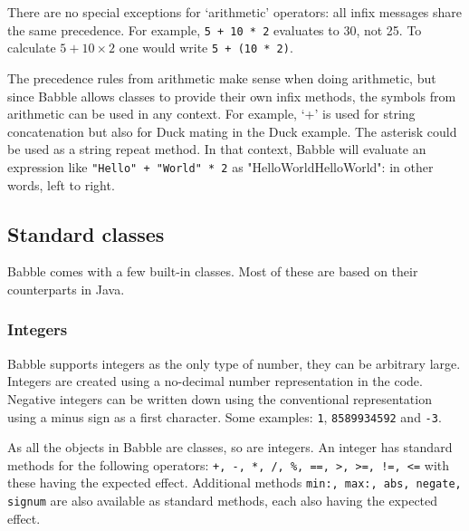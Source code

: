 \documentclass[a4paper]{article}
\begin{document}
There are no special exceptions for `arithmetic' operators: all infix messages share the same precedence.
For example, \texttt{5 + 10 * 2} evaluates to 30, not 25.
To calculate $5 + 10 \times 2$ one would write \texttt{5 + (10 * 2)}.

The precedence rules from arithmetic make sense when doing arithmetic, but since Babble allows classes to provide their own infix methods, the symbols from arithmetic can be used in any context.
For example, `+' is used for string concatenation but also for Duck mating in the Duck example.
The asterisk could  be used as a string repeat method.
In that context, Babble will evaluate an expression like \texttt{"Hello" + "World" * 2} as "HelloWorldHelloWorld": in other words, left to right.

\subsection{Standard classes}

Babble comes with a few built-in classes. Most of these are based on their counterparts in Java.



\subsubsection{Integers}

Babble supports integers as the only type of number, they can be arbitrary large. Integers are created using a no-decimal number representation in the code. Negative integers can be written down using the conventional representation using a minus sign as a first character. Some examples:
\texttt{1}, \texttt{8589934592} and \texttt{-3}.

As all the objects in Babble are classes, so are integers. An integer has standard methods for the following operators: \texttt{+, -, *, /, \%, ==, >, >=, !=, <=} with these having the expected effect. Additional methods \texttt{min:, max:, abs, negate, signum} are also available as standard methods, each also having the expected effect.
\end{document}
